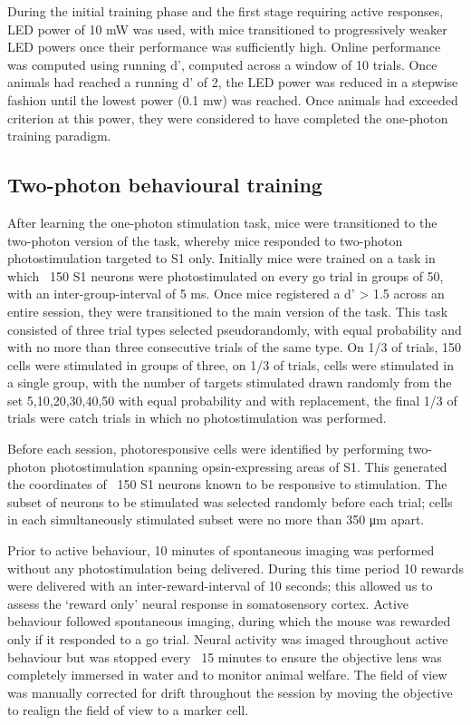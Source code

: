 During the initial training phase and the first stage requiring active responses,  LED power of 10 mW was used, with mice transitioned to progressively weaker LED powers once their performance was sufficiently high. Online performance was computed using running d', computed across a window of 10 trials. Once animals had reached a running d' of 2, the LED power was reduced in a stepwise fashion until the lowest power (0.1 mw) was reached. Once animals had exceeded criterion at this power, they were considered to have completed the one-photon training paradigm.

\subsection{Two-photon behavioural training}

After learning the one-photon stimulation task, mice were transitioned to the two-photon version of the task, whereby mice responded to two-photon photostimulation targeted to S1 only. Initially mice were trained on a task in which ~150 S1 neurons were photostimulated on every go trial in groups of 50, with an inter-group-interval of 5 ms.  Once mice registered a d' > 1.5 across an entire session, they were transitioned to the main version of the task. This task consisted of three trial types selected pseudorandomly, with equal probability and with no more than three consecutive trials of the same type. On 1/3 of trials, 150 cells were stimulated in groups of three, on 1/3 of trials, cells were stimulated in a single group, with the number of targets stimulated drawn randomly from the set {5,10,20,30,40,50} with equal probability and with replacement, the final 1/3 of trials were catch trials in which no photostimulation was performed. 

Before each session, photoresponsive cells were identified by performing two-photon photostimulation spanning opsin-expressing areas of S1. This generated the coordinates of ~150 S1 neurons known to be responsive to stimulation. The subset of neurons to be stimulated was selected randomly before each trial; cells in each simultaneously stimulated subset were no more than 350 μm apart. 

Prior to active behaviour, 10 minutes of spontaneous imaging was performed without any photostimulation being delivered. During this time period 10 rewards were delivered with an inter-reward-interval of 10 seconds; this allowed us to assess the ‘reward only’ neural response in somatosensory cortex. Active behaviour followed spontaneous imaging, during which the mouse was rewarded only if it responded to a go trial. Neural activity was imaged throughout active behaviour but was stopped every ~15 minutes to ensure the objective lens was completely immersed in water and to monitor animal welfare. The field of view was manually corrected for drift throughout the session by moving the objective to realign the field of view to a marker cell.

